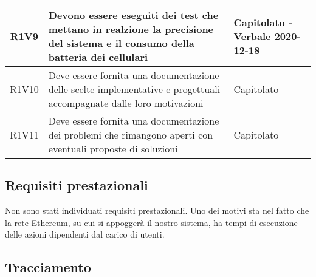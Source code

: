 \begin{center}
\begin{longtable}{|c|p{10cm}|p{4cm}|}
R1V9&Devono essere eseguiti dei test che mettano in realzione la precisione del sistema e il consumo della batteria dei cellulari	& Capitolato - Verbale 2020-12-18	\\
		\hline
R1V10&Deve essere fornita una documentazione delle scelte implementative e progettuali accompagnate dalle loro motivazioni	& Capitolato	\\
		\hline
	R1V11	&Deve essere fornita una documentazione dei problemi che rimangono aperti con eventuali proposte di soluzioni	& Capitolato	\\
		\hline
	\end{longtable}
\end{center}

\subsection{Requisiti prestazionali}
Non sono stati individuati requisiti prestazionali. Uno dei motivi sta nel fatto che la rete Ethereum, su cui si appoggerà il nostro sistema, ha tempi di esecuzione delle azioni dipendenti dal carico di utenti.
%		
%		

\subsection{Tracciamento}
